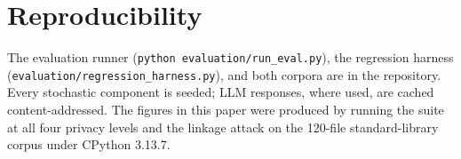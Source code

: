 \documentclass[conference]{IEEEtran}
\begin{document}
\section*{Reproducibility}

The evaluation runner (\texttt{python evaluation/run\_eval.py}), the
regression harness (\texttt{evaluation/regression\_harness.py}), and both
corpora are in the repository. Every stochastic component is seeded; LLM
responses, where used, are cached content-addressed. The figures in this
paper were produced by running the suite at all four privacy levels and
the linkage attack on the 120-file standard-library corpus under CPython
3.13.7.



\end{document}
